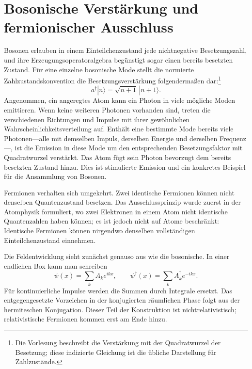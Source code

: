 \section{Bosonische Verstärkung und fermionischer Ausschluss}

Bosonen erlauben in einem Einteilchenzustand jede nichtnegative Besetzungszahl, und ihre Erzeugungsoperatoralgebra begünstigt sogar einen bereits besetzten Zustand. Für eine einzelne bosonische Mode stellt die normierte Zahlzustandskonvention die Besetzungsverstärkung folgendermaßen dar:\footnote{Die Vorlesung beschreibt die Verstärkung mit der Quadratwurzel der Besetzung; diese indizierte Gleichung ist die übliche Darstellung für Zahlzustände.}
\begin{equation}
a^\dagger|n\rangle=\sqrt{n+1}\,|n+1\rangle.
\end{equation}
Angenommen, ein angeregtes Atom kann ein Photon in viele mögliche Moden emittieren. Wenn keine weiteren Photonen vorhanden sind, treten die verschiedenen Richtungen und Impulse mit ihrer gewöhnlichen Wahrscheinlichkeitsverteilung auf. Enthält eine bestimmte Mode bereits viele Photonen---alle mit demselben Impuls, derselben Energie und derselben Frequenz---, ist die Emission in diese Mode um den entsprechenden Besetzungsfaktor mit Quadratwurzel verstärkt. Das Atom fügt sein Photon bevorzugt dem bereits besetzten Zustand hinzu. Dies ist stimulierte Emission und ein konkretes Beispiel für die Ansammlung von Bosonen.

Fermionen verhalten sich umgekehrt. Zwei identische Fermionen können nicht denselben Quantenzustand besetzen. Das Ausschlussprinzip wurde zuerst in der Atomphysik formuliert, wo zwei Elektronen in einem Atom nicht identische Quantenzahlen haben können; es ist jedoch nicht auf Atome beschränkt: Identische Fermionen können nirgendwo denselben vollständigen Einteilchenzustand einnehmen.

Die Feldentwicklung sieht zunächst genauso aus wie die bosonische. In einer endlichen Box kann man schreiben
\begin{equation}
\psi(x)=\sum_k A_k e^{ikx},
\qquad
\psi^\dagger(x)=\sum_k A_k^\dagger e^{-ikx}.
\end{equation}
Für kontinuierliche Impulse werden die Summen durch Integrale ersetzt. Das entgegengesetzte Vorzeichen in der konjugierten räumlichen Phase folgt aus der hermiteschen Konjugation. Dieser Teil der Konstruktion ist nichtrelativistisch; relativistische Fermionen kommen erst am Ende hinzu.

